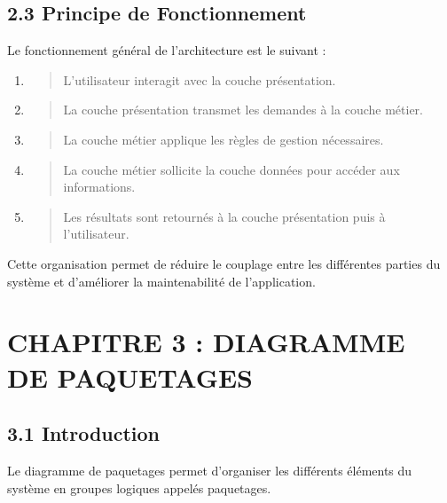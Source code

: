\documentclass[
]{article}
\begin{document}
\hypertarget{principe-de-fonctionnement}{%
\subsection{2.3 Principe de
Fonctionnement}\label{principe-de-fonctionnement}}

Le fonctionnement général de l'architecture est le suivant :

\begin{enumerate}
\def\labelenumi{\arabic{enumi}.}
\item
  \begin{quote}
  L'utilisateur interagit avec la couche présentation.
  \end{quote}
\item
  \begin{quote}
  La couche présentation transmet les demandes à la couche métier.
  \end{quote}
\item
  \begin{quote}
  La couche métier applique les règles de gestion nécessaires.
  \end{quote}
\item
  \begin{quote}
  La couche métier sollicite la couche données pour accéder aux
  informations.
  \end{quote}
\item
  \begin{quote}
  Les résultats sont retournés à la couche présentation puis à
  l'utilisateur.
  \end{quote}
\end{enumerate}

Cette organisation permet de réduire le couplage entre les différentes
parties du système et d'améliorer la maintenabilité de l'application.

\hypertarget{chapitre-3-diagramme-de-paquetages}{%
\section{CHAPITRE 3 : DIAGRAMME DE
PAQUETAGES}\label{chapitre-3-diagramme-de-paquetages}}

\hypertarget{introduction-1}{%
\subsection{3.1 Introduction}\label{introduction-1}}

Le diagramme de paquetages permet d'organiser les différents éléments du
système en groupes logiques appelés paquetages.
\end{document}

